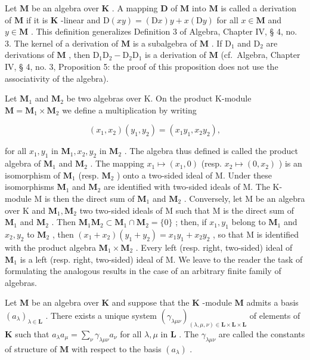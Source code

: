 Let \(\mathbf{M}\) be an algebra over \(\mathbf{K}\) . A mapping \(\mathbf{D}\) of \(\mathbf{M}\) into \(\mathbf{M}\) is called a derivation of \(\mathbf{M}\) if it is \(\mathbf{K}\) -linear and \(\mathrm{D}(xy) = (\mathrm{D}x)y + x(\mathrm{D}y)\) for all \(x \in \mathbf{M}\) and \(y \in \mathbf{M}\) . This definition generalizes Definition 3 of Algebra, Chapter IV, § 4, no. 3. The kernel of a derivation of \(\mathbf{M}\) is a subalgebra of \(\mathbf{M}\) . If \(\mathrm{D}_1\) and \(\mathrm{D}_2\) are derivations of \(\mathbf{M}\) , then \(\mathrm{D}_1\mathrm{D}_2 - \mathrm{D}_2\mathrm{D}_1\) is a derivation of \(\mathbf{M}\) (cf.~Algebra, Chapter IV, § 4, no. 3, Proposition 5: the proof of this proposition does not use the associativity of the algebra).

Let \(\mathbf{M}_1\) and \(\mathbf{M}_2\) be two algebras over K. On the product K-module \(\mathbf{M} = \mathbf{M}_1 \times \mathbf{M}_2\) we define a multiplication by writing

\[
(x _ {1}, x _ {2}) (y _ {1}, y _ {2}) = (x _ {1} y _ {1}, x _ {2} y _ {2}),
\]

for all \(x_1, y_1\) in \(\mathbf{M}_1, x_2, y_2\) in \(\mathbf{M}_2\) . The algebra thus defined is called the product algebra of \(\mathbf{M}_1\) and \(\mathbf{M}_2\) . The mapping \(x_1 \mapsto (x_1, 0)\) (resp. \(x_2 \mapsto (0, x_2)\) ) is an isomorphism of \(\mathbf{M}_1\) (resp. \(\mathbf{M}_2\) ) onto a two-sided ideal of M. Under these isomorphisms \(\mathbf{M}_1\) and \(\mathbf{M}_2\) are identified with two-sided ideals of M. The K-module M is then the direct sum of \(\mathbf{M}_1\) and \(\mathbf{M}_2\) . Conversely, let M be an algebra over K and \(\mathbf{M}_1, \mathbf{M}_2\) two two-sided ideals of M such that M is the direct sum of \(\mathbf{M}_1\) and \(\mathbf{M}_2\) . Then \(\mathbf{M}_1\mathbf{M}_2 \subset \mathbf{M}_1 \cap \mathbf{M}_2 = \{0\}\) ; then, if \(x_1, y_1\) belong to \(\mathbf{M}_1\) and \(x_2, y_2\) to \(\mathbf{M}_2\) , then \((x_1 + x_2)(y_1 + y_2) = x_1y_1 + x_2y_2\) , so that M is identified with the product algebra \(\mathbf{M}_1 \times \mathbf{M}_2\) . Every left (resp. right, two-sided) ideal of \(\mathbf{M}_1\) is a left (resp. right, two-sided) ideal of M. We leave to the reader the task of formulating the analogous results in the case of an arbitrary finite family of algebras.

Let \(\mathbf{M}\) be an algebra over \(\mathbf{K}\) and suppose that the \(\mathbf{K}\) -module \(\mathbf{M}\) admits a basis \((a_{\lambda})_{\lambda \in \mathbf{L}}\) . There exists a unique system \((\gamma_{\lambda \mu \nu})_{(\lambda, \mu, \nu) \in \mathbf{L} \times \mathbf{L} \times \mathbf{L}}\) of elements of \(\mathbf{K}\) such that \(a_{\lambda}a_{\mu} = \sum_{\nu} \gamma_{\lambda \mu \nu}a_{\nu}\) for all \(\lambda, \mu\) in \(\mathbf{L}\) . The \(\gamma_{\lambda \mu \nu}\) are called the constants of structure of \(\mathbf{M}\) with respect to the basis \((a_{\lambda})\) .

